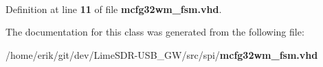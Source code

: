\paragraph[{std\+\_\+logic\+\_\+1164}]{\hspace{0.3cm}{\ttfamily [Package]}}\label{classmcfg32wm__fsm_acd03516902501cd1c7296a98e22c6fcb}


Definition at line {\bf 11} of file {\bf mcfg32wm\+\_\+fsm.\+vhd}.



The documentation for this class was generated from the following file\+:\begin{DoxyCompactItemize}
\item 
/home/erik/git/dev/\+Lime\+S\+D\+R-\/\+U\+S\+B\+\_\+\+G\+W/src/spi/{\bf mcfg32wm\+\_\+fsm.\+vhd}\end{DoxyCompactItemize}

